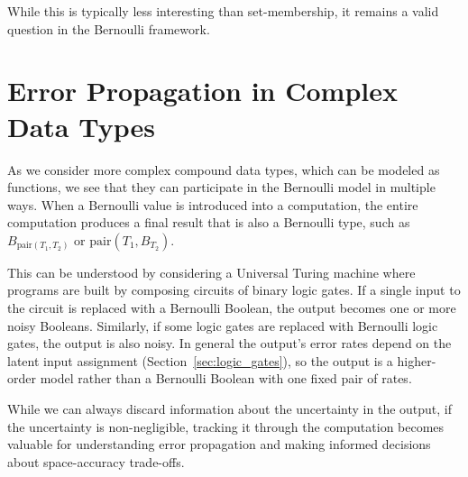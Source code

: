 \documentclass[../main.tex]{subfiles}
\begin{document}
While this is typically less interesting than set-membership, it remains a valid question in the Bernoulli framework.

\section{Error Propagation in Complex Data Types}
\label{sec:error_propagation}

As we consider more complex compound data types, which can be modeled as functions, we see that they can participate in the Bernoulli model in multiple ways. When a Bernoulli value is introduced into a computation, the entire computation produces a final result that is also a Bernoulli type, such as $B_{\mathrm{pair}(T_1,T_2)}$ or $\mathrm{pair}(T_1, B_{T_2})$.

This can be understood by considering a Universal Turing machine where programs are built by composing circuits of binary logic gates. If a single input to the circuit is replaced with a Bernoulli Boolean, the output becomes one or more noisy Booleans. Similarly, if some logic gates are replaced with Bernoulli logic gates, the output is also noisy. In general the output's error rates depend on the latent input assignment (Section~\ref{sec:logic_gates}), so the output is a higher-order model rather than a Bernoulli Boolean with one fixed pair of rates.

While we can always discard information about the uncertainty in the output, if the uncertainty is non-negligible, tracking it through the computation becomes valuable for understanding error propagation and making informed decisions about space-accuracy trade-offs.
\end{document}
